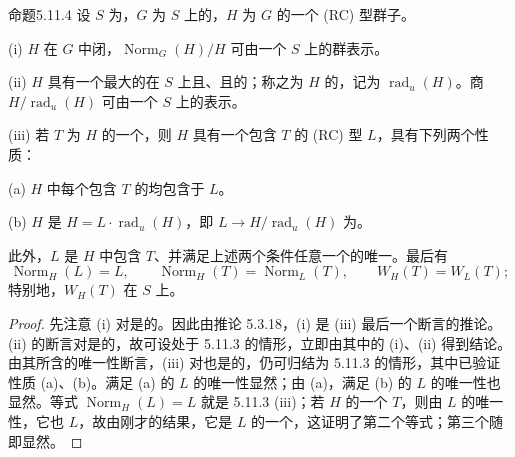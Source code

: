 \begin{SGAresult}{命题}{5.11.4}
设 $S$ 为，$G$ 为 $S$ 上的，$H$ 为 $G$ 的一个 (RC) 型群子。

(i) $H$ 在 $G$ 中闭，$\operatorname{Norm}_G(H)/H$ 可由一个 $S$ 上的群表示。

(ii) $H$ 具有一个最大的在 $S$ 上且、且的；称之为 $H$ 的，记为 $\operatorname{rad}_u(H)$。商 $H/\operatorname{rad}_u(H)$ 可由一个 $S$ 上的表示。

(iii) 若 $T$ 为 $H$ 的一个，则 $H$ 具有一个包含 $T$ 的 (RC) 型 $L$，具有下列两个性质：

(a) $H$ 中每个包含 $T$ 的均包含于 $L$。

(b) $H$ 是 $H=L\cdot\operatorname{rad}_u(H)$，即 $L\to H/\operatorname{rad}_u(H)$ 为。

此外，$L$ 是 $H$ 中包含 $T$、并满足上述两个条件任意一个的唯一。最后有
\[\operatorname{Norm}_H(L)=L,\qquad\operatorname{Norm}_H(T)=\operatorname{Norm}_L(T),\qquad W_H(T)=W_L(T);\]
特别地，$W_H(T)$ 在 $S$ 上。
\end{SGAresult}
\begin{proof}
先注意 (i) 对是的。因此由推论 5.3.18，(i) 是 (iii) 最后一个断言的推论。
(ii) 的断言对是的，故可设处于 5.11.3 的情形，立即由其中的 (i)、(ii) 得到结论。
由其所含的唯一性断言，(iii) 对也是的，仍可归结为 5.11.3 的情形，其中已验证性质 (a)、(b)。满足 (a) 的 $L$ 的唯一性显然；由 (a)，满足 (b) 的 $L$ 的唯一性也显然。等式 $\operatorname{Norm}_H(L)=L$ 就是 5.11.3 (iii)；若 $H$ 的一个 $T$，则由 $L$ 的唯一性，它也 $L$，故由刚才的结果，它是 $L$ 的一个，这证明了第二个等式；第三个随即显然。
\end{proof}
